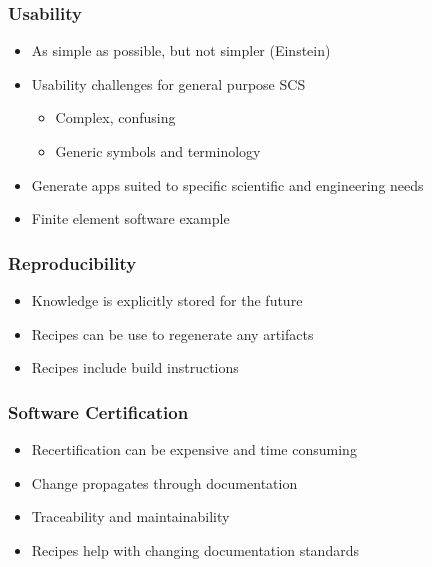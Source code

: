 \documentclass{beamer}
\begin{document}

\begin{frame}

\frametitle{Usability}

\begin{itemize}
\item As simple as possible, but not simpler (Einstein)
\item Usability challenges for general purpose SCS
\begin{itemize}
\item Complex, confusing
\item Generic symbols and terminology
\end{itemize}
\item Generate apps suited to specific scientific and engineering needs
\item Finite element software example
\end{itemize}
\end{frame}


\begin{frame}

\frametitle{Reproducibility}

\begin{itemize}
\item Knowledge is explicitly stored for the future
\item Recipes can be use to regenerate any artifacts
\item Recipes include build instructions
\end{itemize}
\end{frame}


\begin{frame}

\frametitle{Software Certification}

\begin{itemize}
\item Recertification can be expensive and time consuming
\item Change propagates through documentation
\item Traceability and maintainability
\item Recipes help with changing documentation standards
\end{itemize}

\end{frame}
\end{document}
